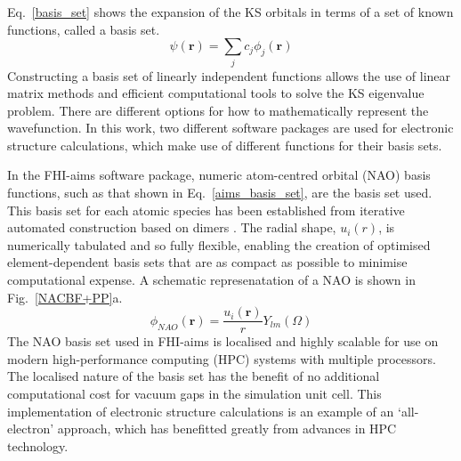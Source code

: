 \documentclass[11pt, twoside]{report}
\begin{document}
Eq.~\ref{basis_set} shows the expansion of the KS orbitals in terms of a set of known functions, called a basis set. 
\begin{equation}\label{basis_set}
\psi(\mathbf{r}) = \sum_j c_j \phi_j(\mathbf{r})
\end{equation}
Constructing a basis set of linearly independent functions allows the use of linear matrix methods and efficient computational tools to solve the KS eigenvalue problem. There are different options for how to mathematically represent the wavefunction. In this work, two different software packages are used for electronic structure calculations, which make use of different functions for their basis sets. 


In the FHI-aims software package, numeric atom-centred orbital (NAO) basis functions, such as that shown in Eq.~\ref{aims_basis_set}, are the basis set used. This basis set for each atomic species has been established from iterative automated construction based on dimers \cite{FHI-aims_slides}. The radial shape, $u_i(r)$, is numerically tabulated and so fully flexible, enabling the creation of optimised element-dependent basis sets that are as compact as possible to minimise computational expense. A schematic represenatation of a NAO is shown in Fig.~\ref{NACBF+PP}a.
\begin{equation}\label{aims_basis_set}
\phi_{NAO}(\mathbf{r}) = \frac{u_i(\mathbf{r})}{r} Y_{lm}(\Omega)
\end{equation}
The NAO basis set used in FHI-aims is localised and highly scalable for use on modern high-performance computing (HPC) systems with multiple processors. The localised nature of the basis set has the benefit of no additional computational cost for vacuum gaps in the simulation unit cell. This implementation of electronic structure calculations is an example of an `all-electron' approach, which has benefitted greatly from advances in HPC technology. 
\end{document}

